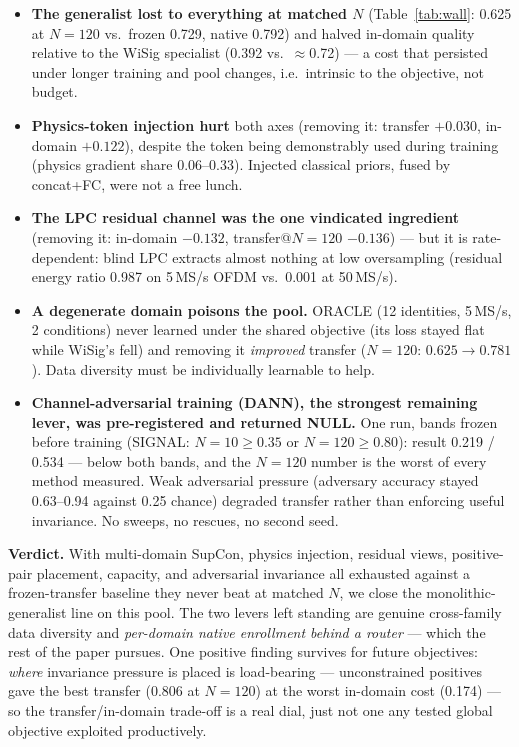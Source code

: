 \documentclass[conference]{IEEEtran}
\begin{document}
\begin{itemize}
  \item \textbf{The generalist lost to everything at matched $N$} (Table~\ref{tab:wall}: 0.625
  at $N{=}120$ vs.\ frozen 0.729, native 0.792) and halved in-domain quality relative to the
  WiSig specialist (0.392 vs.\ $\approx$0.72) --- a cost that persisted under longer training and
  pool changes, i.e.\ intrinsic to the objective, not budget.
  \item \textbf{Physics-token injection hurt} both axes (removing it: transfer $+0.030$,
  in-domain $+0.122$), despite the token being demonstrably used during training (physics
  gradient share 0.06--0.33). Injected classical priors, fused by concat+FC, were not a free
  lunch.
  \item \textbf{The LPC residual channel was the one vindicated ingredient} (removing it:
  in-domain $-0.132$, transfer@$N{=}120$ $-0.136$) --- but it is rate-dependent: blind LPC
  extracts almost nothing at low oversampling (residual energy ratio 0.987 on 5\,MS/s OFDM vs.\
  0.001 at 50\,MS/s).
  \item \textbf{A degenerate domain poisons the pool.} ORACLE (12 identities, 5\,MS/s, 2
  conditions) never learned under the shared objective (its loss stayed flat while WiSig's fell)
  and removing it \emph{improved} transfer ($N{=}120$: $0.625\!\to\!0.781$). Data diversity must
  be individually learnable to help.
  \item \textbf{Channel-adversarial training (DANN), the strongest remaining lever, was
  pre-registered and returned NULL.} One run, bands frozen before training (SIGNAL: $N{=}10 \ge
  0.35$ or $N{=}120\ge0.80$): result 0.219 / 0.534 --- below both bands, and the $N{=}120$ number
  is the worst of every method measured. Weak adversarial pressure (adversary accuracy stayed
  0.63--0.94 against 0.25 chance) degraded transfer rather than enforcing useful invariance. No
  sweeps, no rescues, no second seed.
\end{itemize}

\textbf{Verdict.} With multi-domain SupCon, physics injection, residual views, positive-pair
placement, capacity, and adversarial invariance all exhausted against a frozen-transfer baseline
they never beat at matched $N$, we close the monolithic-generalist line on this pool. The two
levers left standing are genuine cross-family data diversity and \emph{per-domain native
enrollment behind a router} --- which the rest of the paper pursues. One positive finding
survives for future objectives: \emph{where} invariance pressure is placed is load-bearing ---
unconstrained positives gave the best transfer (0.806 at $N{=}120$) at the worst in-domain cost
(0.174) --- so the transfer/in-domain trade-off is a real dial, just not one any tested global
objective exploited productively.
\end{document}
